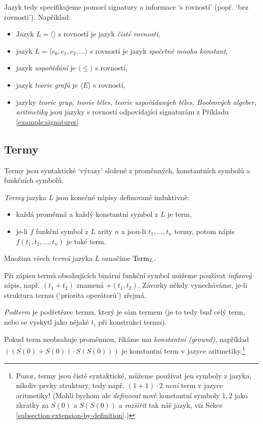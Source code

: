 Jazyk tedy specifikujeme pomocí signatury a informace `s rovností' (popř. `bez rovnosti'). Například:
\begin{itemize}
    \item Jazyk $L=\langle\rangle$ s rovností je jazyk \emph{čisté rovnosti},
    \item jazyk $L=\langle c_0,c_1,c_2,\dots\rangle$ s rovností je jazyk \emph{spočetně mnoha konstant},
    \item jazyk \emph{uspořádání} je $\langle \leq \rangle$ s rovností,
    \item jazyk \emph{teorie grafů} je $\langle E \rangle$ s rovností,
    \item jazyky \emph{teorie grup, teorie těles, teorie uspořádaných těles, Booleových algeber, aritmetiky} jsou jazyky s rovností odpovídající signaturám z Příkladu \ref{example:signatures}
\end{itemize}


\subsection{Termy}

Termy jsou syntaktické `výrazy' složené z proměnných, konstantních symbolů a funkčních symbolů.

\begin{definition}[Termy]
    \emph{Termy} jazyka $L$ jsou konečné nápisy definované induktivně:
    \begin{itemize}
        \item každá proměnná a každý konstantní symbol z $L$ je term,
        \item je-li $f$ funkční symbol z $L$ arity $n$ a jsou-li $t_1,\dots,t_n$ termy, potom nápis $f(t_1,t_2,\dots,t_n)$ je také term.
    \end{itemize}
    Množinu všech \emph{termů} jazyka $L$ označíme $\operatorname{Term}_L$. 
\end{definition}

Při zápisu termů obsahujících binární funkční symbol můžeme používat \emph{infixový} zápis, např. $(t_1+t_2)$ znamená $+(t_1,t_2)$. Závorky někdy vynecháváme, je-li struktura termu (`priorita operátorů') zřejmá.

\emph{Podterm} je podřetězec termu, který je sám termem (je to tedy buď celý term, nebo se vyskytl jako nějaké $t_i$ při konstrukci termu).

Pokud term neobsahuje proměnnou, říkáme mu \emph{konstantní (ground)}, například $((S(0)+S(0))\cdot S(S(0)))$ je konstantní term v jazyce aritmetiky.\footnote{Pozor, termy jsou čistě syntaktické, můžeme používat jen symboly z jazyka, nikoliv prvky struktury, tedy např. $(1+1)\cdot 2$ \emph{není} term v jazyce aritmetiky! (Mohli bychom ale \emph{definovat} nové konstantní symboly $1,2$ jako zkratky za $S(0)$ a $S(S(0))$ a \emph{rozšířit} tak náš jazyk, viz Sekce \ref{subsection:extension-by-definition}.)}

